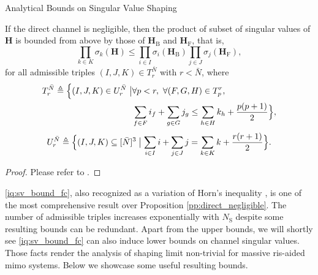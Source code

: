 \begin{section}{Analytical Bounds on Singular Value Shaping}
	\begin{corollary}
		If the direct channel is negligible,
		then the product of subset of singular values of $\mathbf{H}$ is bounded from above by those of $\mathbf{H}_\mathrm{B}$ and $\mathbf{H}_\mathrm{F}$, that is,
		\begin{equation}
			\prod_{k \in {K}} \sigma_k(\mathbf{H}) \le \prod_{i \in {I}} \sigma_i(\mathbf{H}_\mathrm{B}) \prod_{j \in {J}} \sigma_j(\mathbf{H}_\mathrm{F}),
			\label{iq:sv_bound_fc}
		\end{equation}
		for all admissible triples $(I, J, K) \in T_r^{\bar{N}}$ with $r < \bar{N}$, where
		\begin{equation*}
			\begin{split}
				T_r^{\bar{N}} \triangleq \Bigl\{(I, J, K) \in U_r^{\bar{N}} \bigm\vert & \forall p < r, \ \forall (F, G, H) \in T_p^r,                                              \\
																						& \sum_{f \in F} i_f + \sum_{g \in G} j_g \le \sum_{h \in H} k_h + \frac{p(p+1)}{2} \Bigr\},
			\end{split}
		\end{equation*}
		\begin{equation*}
			U_r^{\bar{N}} \triangleq \Bigl\{(I, J, K) \subseteq [\bar{N}]^3 \bigm\vert \sum_{i \in I} i + \sum_{j \in J} j = \sum_{k \in K} k + \frac{r(r+1)}{2}\Bigr\}.
		\end{equation*}
	\end{corollary}

	\begin{proof}
		Please refer to \cite[Theorem~8]{Fulton2000}.
	\end{proof}

	\eqref{iq:sv_bound_fc}, also recognized as a variation of Horn's inequality \cite{Bhatia2001}, is one of the most comprehensive result over Proposition \ref{pp:direct_negligible}.
	The number of admissible triples increases exponentially with $N_\mathrm{S}$ despite some resulting bounds can be redundant.
	Apart from the upper bounds, we will shortly see \eqref{iq:sv_bound_fc} can also induce lower bounds on channel singular values.
	Those facts render the analysis of shaping limit non-trivial for massive \gls{ris}-aided \gls{mimo} systems.
	Below we showcase some useful resulting bounds.


\end{section}
